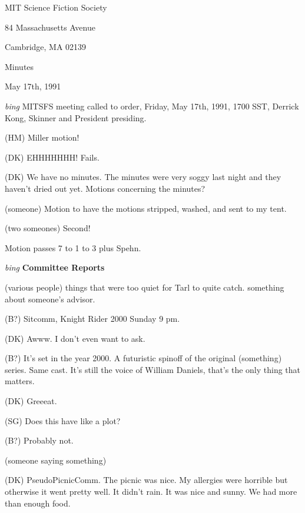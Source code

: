 \setlength{\topmargin}{-0.5in}
\setlength{\oddsidemargin}{0.0in}
\setlength{\evensidemargin}{0.0in}
\setlength{\textheight}{9in}
\setlength{\textwidth}{6.5in}



\begin{center}
MIT Science Fiction Society

84 Massachusetts Avenue

Cambridge, MA 02139

\vspace{0.2in}
Minutes

May 17th, 1991

\end{center}

\vspace{0.15in}
{\em bing\/}  MITSFS meeting called to order, Friday, May 17th, 1991,
1700 SST, Derrick Kong, Skinner and President presiding.

(HM) Miller motion!

(DK) EHHHHHHH! Fails.

(DK) We have no minutes.  The minutes were very soggy last night and
they haven't dried out yet.  Motions concerning the minutes?

(someone) Motion to have the motions stripped, washed, and sent to my
tent.

(two someones) Second!

Motion passes 7 to 1 to 3 plus Spehn.

\vspace{0.15in}
{\em bing\/} {\bf Committee Reports\/}

(various people) things that were too quiet for Tarl to quite catch.
something about someone's advisor.

(B?) Sitcomm, Knight Rider 2000 Sunday 9 pm.

(DK) Awww.  I don't even want to ask.

(B?) It's set in the year 2000.  A futuristic spinoff of the original
(something) series.  Same cast.  It's still the voice of William
Daniels, that's the only thing that matters.

(DK) Greeeat.

(SG) Does this have like a plot?

(B?) Probably not.

(someone saying something)

(DK) PseudoPicnicComm.  The picnic was nice.  My allergies were
horrible but otherwise it went pretty well.  It didn't rain.  It was
nice and sunny.  We had more than enough food.

